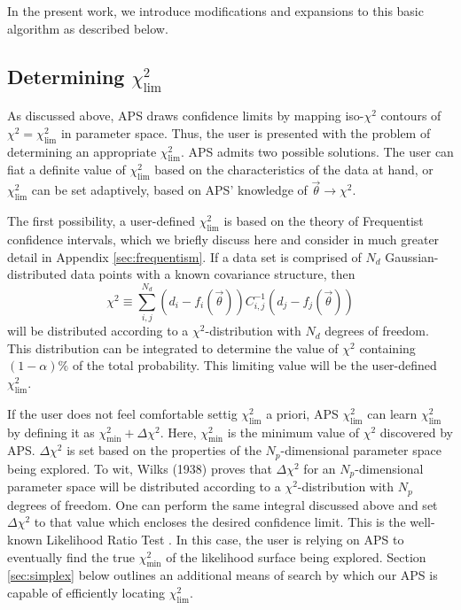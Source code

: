 \documentclass[useAMS,usenatbib]{aastex}
\begin{document}
In the present work, we introduce modifications and expansions to this basic algorithm as
described below.

\subsection{Determining $\chi^2_\text{lim}$}
\label{sec:chi}

As discussed above, APS draws confidence limits by mapping
iso-$\chi^2$ contours of $\chi^2=\chi^2_\text{lim}$ in parameter space.
Thus, the user is presented with the problem of determining an
appropriate $\chi^2_\text{lim}$.  APS admits two possible solutions.
The user can fiat a definite value of $\chi^2_\text{lim}$
based on the characteristics of the data at hand,
or $\chi^2_\text{lim}$ can be set adaptively, based on APS'
knowledge of $\vec{\theta}\rightarrow\chi^2$.

The first possibility, a user-defined $\chi^2_\text{lim}$ is based
on the theory of Frequentist confidence intervals, which we briefly discuss
here and consider in much greater detail in Appendix \ref{sec:frequentism}.
If a data set is comprised of $N_d$ Gaussian-distributed data points
with a known covariance structure, then 
\begin{equation}
\chi^2\equiv\sum_{i,j}^{N_d}(d_i-f_i(\vec{\theta}))C^{-1}_{i,j}
(d_j-f_j(\vec{\theta}))
\end{equation}
will be distributed according to a $\chi^2$-distribution with $N_d$ degrees
of freedom.  This distribution can be integrated to determine the value
of $\chi^2$ containing $(1-\alpha)\%$ of the total probability.  This limiting
value will be the user-defined $\chi^2_\text{lim}$.

If the user does not feel comfortable settig $\chi^2_\text{lim}$
a priori, APS $\chi^2_\text{lim}$ can learn $\chi^2_\text{lim}$ by
defining it as $\chi^2_\text{min}+\Delta\chi^2$.  Here, $\chi^2_\text{min}$
is the minimum value of $\chi^2$ discovered by APS.  
$\Delta \chi^2$ is set
based on the properties of the $N_p$-dimensional parameter space being explored.
To wit, Wilks (1938) proves that $\Delta\chi^2$ for an $N_p$-dimensional
parameter space will be distributed according to a $\chi^2$-distribution
with $N_p$ degrees of freedom.  One can perform the same integral discussed
above and set $\Delta\chi^2$ to that value which encloses the desired confidence
limit.  This is the well-known Likelihood Ratio Test \cite{np}.
In this case, the user is relying on APS to eventually find the true
$\chi^2_\text{min}$ of the likelihood surface being explored.  
Section \ref{sec:simplex} below outlines an additional means of search
by which our APS is capable of efficiently locating $\chi^2_\text{lim}$.
\end{document}
